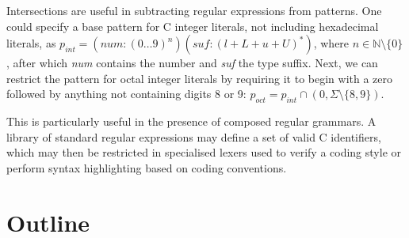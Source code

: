 Intersections are useful in subtracting regular expressions from patterns. One
could specify a base pattern for C integer literals, not including hexadecimal
literals, as $p_{\mathit{int}} = (\mathit{num}:(0 \dots 9)^n)
(\mathit{suf}:(l+L+u+U)^*)$, where $n \in \mathbb{N} \setminus \{0\}$, after
which \textit{num} contains the number and \textit{suf} the type suffix. Next,
we can restrict the pattern for octal integer literals by requiring it to begin
with a zero followed by anything not containing digits 8 or 9: $p_{\mathit{oct}}
= p_{\mathit{int}} \cap (0, \Sigma \setminus \{8, 9\})$.

This is particularly useful in the presence of composed regular grammars. A
library of standard regular expressions may define a set of valid C identifiers,
which may then be restricted in specialised lexers used to verify a coding style
or perform syntax highlighting based on coding conventions.


\section{Outline}

